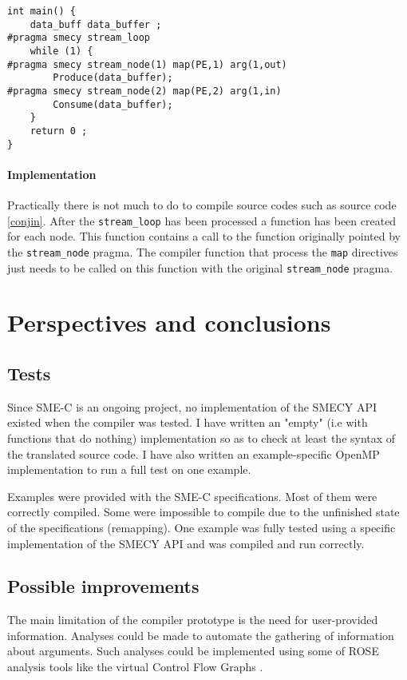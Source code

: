\documentclass[a4paper]{article}
\begin{document}
	\begin{lstlisting}[label=conjin,caption={Input code with streaming and mapping pragmas. Definitions of functions \texttt{Produce} and \texttt{Consume} are not shown.}]
int main() {
	data_buff data_buffer ;
#pragma smecy stream_loop
	while (1) {
#pragma smecy stream_node(1) map(PE,1) arg(1,out)
		Produce(data_buffer);
#pragma smecy stream_node(2) map(PE,2) arg(1,in)
		Consume(data_buffer);
	}
	return 0 ;
}
	\end{lstlisting}
	
	\paragraph{Implementation} Practically there is not much to do to compile source codes such as source code \ref{conjin}. After the \verb+stream_loop+ has been processed a function has been created for each node. This function contains a call to the function originally pointed by the \verb+stream_node+ pragma. The compiler function that process the \verb+map+ directives just needs to be called on this function with the original \verb+stream_node+ pragma.

\section{Perspectives and conclusions}
	\subsection{Tests}
	Since SME-C is an ongoing project, no implementation of the SMECY API existed when the compiler was tested. I have written an "empty" (i.e with functions that do nothing) implementation so as to check at least the syntax of the translated source code. I have also written an example-specific OpenMP implementation to run a full test on one example.
	
	Examples were provided with the SME-C specifications. Most of them were correctly compiled. Some were impossible to compile due to the unfinished state of the specifications (remapping). One example was fully tested using a specific implementation of the SMECY API and was compiled and run correctly.
	
	\subsection{Possible improvements}
	The main limitation of the compiler prototype is the need for user-provided information. Analyses could be made to automate the gathering of information about arguments. Such analyses could be implemented using some of ROSE analysis tools like the virtual Control Flow Graphs \cite{tuto}.
	
\end{document}
